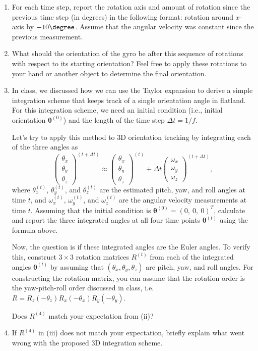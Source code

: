 \documentclass[conference]{styles/acmsiggraph}
\newcommand{\pointsin}[1]{\normalfont{(\textit{#1pts})}}
\begin{document}
\begin{enumerate}[label=(\roman*)]
\item For each time step, report the rotation axis and amount of rotation since the previous time step (in degrees) in the following format: rotation around $x$-axis by $-10\degree$. Assume that the angular velocity was constant since the previous measurement. \pointsin{3}
\item What should the orientation of the gyro be after this sequence of rotations with respect to its starting orientation? Feel free to apply these rotations to your hand or another object to determine the final orientation. \pointsin{5}
\item
In class, we discussed how we can use the Taylor expansion to derive a simple integration scheme that keeps track of a single orientation angle in flatland. For this integration scheme, we need an initial condition (i.e., initial orientation $\boldsymbol\theta^{(0)}$) and the length of the time step $\Delta t = 1/f$.

Let's try to apply this method to 3D orientation tracking by integrating each of the three angles as
$$\begin{pmatrix}
\theta_x \\ \theta_y \\ \theta_z
\end{pmatrix}^{(t + \Delta t)} \approx
\begin{pmatrix}
\theta_x \\ \theta_y \\ \theta_z
\end{pmatrix}^{(t)} + \Delta t
\begin{pmatrix}
\omega_x \\ \omega_y \\ \omega_z
\end{pmatrix}^{(t+\Delta t)},$$
%
where $\theta_x^{(t)}$, $\theta_y^{(t)}$, and $\theta_z^{(t)}$ are the estimated pitch, yaw, and roll angles at time $t$, and $\omega_x^{(t)}$,  $\omega_y^{(t)}$, and $\omega_z^{(t)}$ are the angular velocity measurements at time $t$. Assuming that the initial condition is $\boldsymbol\theta^{(0)} = \left(0,\ 0,\ 0\right)^T$, calculate and report the three integrated angles at all four time points $\boldsymbol{\theta}^{(t)}$ using the formula above.

Now, the question is if these integrated angles are the Euler angles. To verify this, construct $3 \times 3$ rotation matrices $R^{(t)}$ from each of the integrated angles $\boldsymbol{\theta}^{(t)}$ by assuming that $(\theta_x, \theta_y, \theta_z)$ are pitch, yaw, and roll angles. For constructing the rotation matrix, you can assume that the rotation order is the yaw-pitch-roll order discussed in class, i.e. $R = R_z(-\theta_z) R_x(-\theta_x) R_y(-\theta_y)$.

Does $R^{(4)}$ match your expectation from (ii)? \pointsin{5}

\item If $R^{(4)}$ in (iii) does not match your expectation, briefly explain what went wrong with the proposed 3D integration scheme. \pointsin{5}
\end{enumerate}
\end{document}
